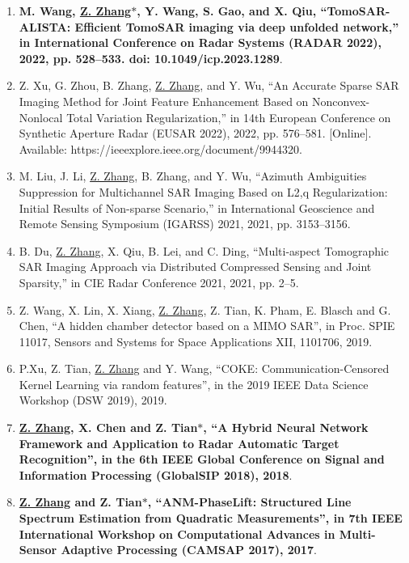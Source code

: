 \documentclass[paper=a4,fontsize=11pt]{scrartcl}
\begin{document}
\begin{enumerate}
\item \textbf{M. Wang, \underline{Z. Zhang$\ast$}, Y. Wang, S. Gao, and X. Qiu, ``TomoSAR-ALISTA: Efficient TomoSAR imaging via deep unfolded network,'' in International Conference on Radar Systems (RADAR 2022), 2022, pp. 528–533. doi: 10.1049/icp.2023.1289}.

\item Z. Xu, G. Zhou, B. Zhang, \underline{Z. Zhang}, and Y. Wu, ``An Accurate Sparse SAR Imaging Method for Joint Feature Enhancement Based on Nonconvex-Nonlocal Total Variation Regularization,'' in 14th European Conference on Synthetic Aperture Radar (EUSAR 2022), 2022, pp. 576–581. [Online]. Available: https://ieeexplore.ieee.org/document/9944320.
	
\item M. Liu, J. Li, \underline{Z. Zhang}, B. Zhang, and Y. Wu, ``Azimuth Ambiguities Suppression for Multichannel SAR Imaging Based on L2,q Regularization: Initial Results of Non-sparse Scenario,'' in International Geoscience and Remote Sensing Symposium (IGARSS) 2021, 2021, pp. 3153–3156.

\item B. Du, \underline{Z. Zhang}, X. Qiu, B. Lei, and C. Ding, ``Multi-aspect Tomographic SAR Imaging Approach via Distributed Compressed Sensing and Joint Sparsity,'' in CIE Radar Conference 2021, 2021, pp. 2–5.
	
\item {Z. Wang, X. Lin, X. Xiang, \underline{Z. Zhang}, Z. Tian, K. Pham, E. Blasch and G. Chen, ``A hidden chamber detector based on a MIMO SAR'', in Proc. SPIE 11017, Sensors and Systems for Space Applications XII, 1101706, 2019}.	
	
\item {P.Xu, Z. Tian, \underline{Z. Zhang} and Y. Wang, ``COKE: Communication-Censored Kernel Learning via random features'', in the 2019 IEEE Data Science Workshop (DSW 2019), 2019}.	
	
\item \textbf{\underline{Z. Zhang}, X. Chen and Z. Tian$\ast$, ``A Hybrid Neural Network Framework and Application to Radar Automatic Target Recognition'', in the 6th IEEE Global Conference on Signal and Information Processing (GlobalSIP 2018), 2018}.

\item \textbf{\underline{Z. Zhang} and Z. Tian$\ast$, ``ANM-PhaseLift: Structured Line Spectrum Estimation from Quadratic Measurements'', in 7th IEEE International Workshop on Computational Advances in Multi-Sensor Adaptive Processing (CAMSAP 2017), 2017}.


\end{enumerate}
\end{document}

